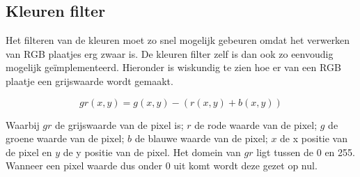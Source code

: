 \subsection{Kleuren filter}
\label{sub:kleurfilt}

Het filteren van de kleuren moet zo snel mogelijk gebeuren omdat het verwerken van
RGB plaatjes erg zwaar is. De kleuren filter zelf is dan ook zo eenvoudig mogelijk
geïmplementeerd. Hieronder is wiskundig te zien hoe er van een RGB plaatje een
grijswaarde wordt gemaakt.

\[ gr(x, y) = g(x, y) - (r(x, y) + b(x, y)) \]

Waarbij $gr$ de grijswaarde van de pixel is; $r$ de rode waarde van de pixel;
$g$ de groene waarde van de pixel; $b$ de blauwe waarde van de pixel; $x$ de x
positie van de pixel en $y$ de y positie van de pixel. Het domein van $gr$ ligt
tussen de 0 en 255. Wanneer een pixel waarde dus onder 0 uit komt wordt deze
gezet op nul.

